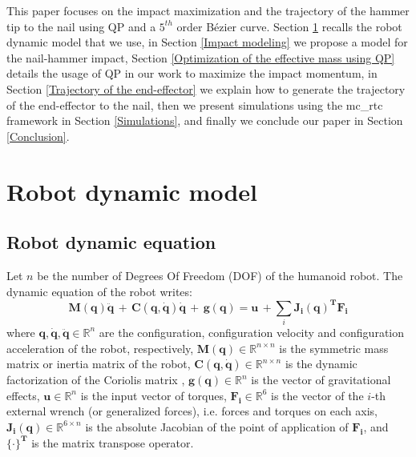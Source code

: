\documentclass[conference]{IEEEtran}
\begin{document}
This paper focuses on the impact maximization and the trajectory of the hammer tip to the nail using QP and a $5^{th}$ order Bézier curve.
Section \ref{Robot dynamic model} recalls the robot dynamic model that we use, 
in Section \ref{Impact modeling} we propose a model for the nail-hammer impact, 
Section \ref{Optimization of the effective mass using QP} details the usage of QP in our work to maximize the impact momentum, 
in Section \ref{Trajectory of the end-effector} we explain how to generate the trajectory of the end-effector to the nail, 
then we present simulations using the mc\_rtc framework \cite{mcrtc} in Section \ref{Simulations}, and finally we conclude our paper in Section \ref{Conclusion}.

\section{Robot dynamic model}
\label{Robot dynamic model}
\subsection{Robot dynamic equation}
\noindent
Let $n$ be the number of Degrees Of Freedom (DOF) of the humanoid robot. The dynamic equation of the robot writes:
\begin{equation}
    \mathbf{M(q) \ddot q} \, + \, \mathbf{C(q, \dot q) \dot q} \, + \, \mathbf{g(q)} = \mathbf{u} \, +  \sum_i \mathbf{J_i(q)^T F_i}
\label{RDE}
\end{equation}
where $\mathbf{q, \dot q, \ddot q} \in \mathbb{R}^n$ are the configuration, configuration velocity and configuration acceleration of the robot, respectively, $\mathbf{M(q)} \in \mathbb{R}^{n \times n}$ is the symmetric mass matrix or inertia matrix of the robot,
     $\mathbf{C(q, \dot q)} \in \mathbb{R}^{n \times n}$ is the dynamic factorization of the Coriolis matrix \cite{bjerkengNewCoriolisMatrix2012},
     $\mathbf{g(q)} \in \mathbb{R}^n $ is the vector of gravitational effects,
     $\mathbf{u} \in \mathbb{R}^{n}$ is the input vector of torques,
     $\mathbf{F_i} \in \mathbb{R}^{6}$ is the vector of the $i$-th external wrench (or generalized forces), i.e. forces and torques on each axis, 
     $\mathbf{J_i(q)} \in \mathbb{R}^{6 \times n}$ is the absolute Jacobian of the point of application of $\mathbf{F_i}$, and $\{ \cdot \}^\mathbf{T}$ is the matrix transpose operator.
     
\end{document}
